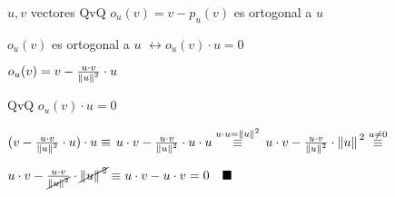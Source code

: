 \documentclass[../practica_01.tex]{subfiles}
\begin{document}
$u, v$ vectores QvQ  $o_u(v)=v-p_u(v)$ es ortogonal a $u$

$o_u(v)$ es ortogonal a $u$ $\leftrightarrow o_u(v) \cdot u = 0$ 

$o_u(v) = v - \frac{u \cdot v}{\norm*{u}^2} \cdot u$

QvQ $o_u(v) \cdot u = 0$

$(v - \frac{u \cdot v}{\norm*{u}^2} \cdot u) \cdot u \equiv $
$u \cdot v - \frac{u \cdot v}{\norm*{u}^2} \cdot u \cdot u \stackrel{u \cdot u = \norm*{u}^2}{\equiv}$
$u \cdot v - \frac{u \cdot v}{\norm*{u}^2} \cdot \norm*{u}^2 \stackrel{u\neq 0}{\equiv}$

$u \cdot v - \frac{u \cdot v}{\cancel{\norm*{u}^2}} \cdot \cancel{\norm*{u}^2} \equiv u \cdot v - u \cdot v = 0 \quad\blacksquare$
\end{document}
